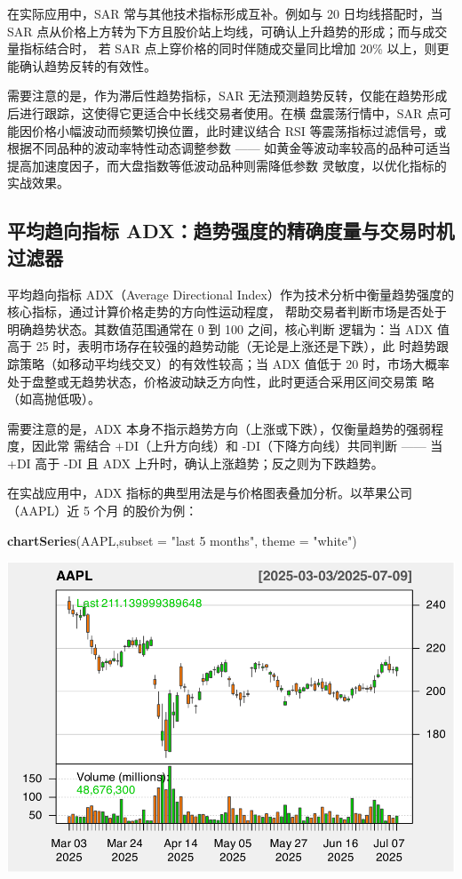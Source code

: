 \documentclass[]{ctexbook}
\newenvironment{Shaded}{\begin{snugshade}}{\end{snugshade}}
\newcommand{\AttributeTok}[1]{\textcolor[rgb]{0.13,0.29,0.53}{#1}}
\newcommand{\FunctionTok}[1]{\textcolor[rgb]{0.13,0.29,0.53}{\textbf{#1}}}
\newcommand{\NormalTok}[1]{#1}
\newcommand{\StringTok}[1]{\textcolor[rgb]{0.31,0.60,0.02}{#1}}
\begin{document}
在实际应用中，SAR 常与其他技术指标形成互补。例如与 20 日均线搭配时，当 SAR 点从价格上方转为下方且股价站上均线，可确认上升趋势的形成；而与成交量指标结合时，
若 SAR 点上穿价格的同时伴随成交量同比增加 20\% 以上，则更能确认趋势反转的有效性。

需要注意的是，作为滞后性趋势指标，SAR 无法预测趋势反转，仅能在趋势形成后进行跟踪，这使得它更适合中长线交易者使用。在横
盘震荡行情中，SAR 点可能因价格小幅波动而频繁切换位置，此时建议结合 RSI 等震荡指标过滤信号，或根据不同品种的波动率特性动态调整参数 ------ 如黄金等波动率较高的品种可适当提高加速度因子，而大盘指数等低波动品种则需降低参数
灵敏度，以优化指标的实战效果。

\subsection{平均趋向指标 ADX：趋势强度的精确度量与交易时机过滤器}\label{ux5e73ux5747ux8d8bux5411ux6307ux6807-adxux8d8bux52bfux5f3aux5ea6ux7684ux7cbeux786eux5ea6ux91cfux4e0eux4ea4ux6613ux65f6ux673aux8fc7ux6ee4ux5668}

平均趋向指标 ADX（Average Directional Index）作为技术分析中衡量趋势强度的核心指标，通过计算价格走势的方向性运动程度，
帮助交易者判断市场是否处于明确趋势状态。其数值范围通常在 0 到 100 之间，核心判断
逻辑为：当 ADX 值高于 25 时，表明市场存在较强的趋势动能（无论是上涨还是下跌），此
时趋势跟踪策略（如移动平均线交叉）的有效性较高；当 ADX 值低于 20 时，市场大概率处于盘整或无趋势状态，价格波动缺乏方向性，此时更适合采用区间交易策
略（如高抛低吸）。

需要注意的是，ADX 本身不指示趋势方向（上涨或下跌），仅衡量趋势的强弱程度，因此常
需结合 +DI（上升方向线）和 -DI（下降方向线）共同判断 ------ 当 +DI 高于 -DI 且 ADX 上升时，确认上涨趋势；反之则为下跌趋势。

在实战应用中，ADX 指标的典型用法是与价格图表叠加分析。以苹果公司（AAPL）近 5 个月
的股价为例：

\begin{Shaded}
\begin{Highlighting}[]
\FunctionTok{chartSeries}\NormalTok{(AAPL,}\AttributeTok{subset =} \StringTok{"last 5 months"}\NormalTok{, }\AttributeTok{theme =} \StringTok{"white"}\NormalTok{)}
\end{Highlighting}
\end{Shaded}

\includegraphics[width=0.9\linewidth]{quantmod_files/figure-latex/adx-1}
\end{document}
